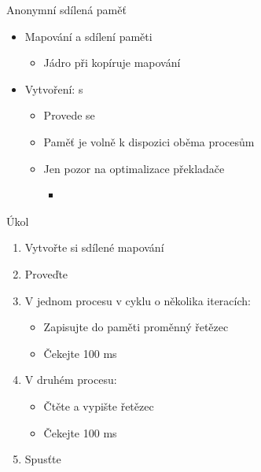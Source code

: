 
\begin{frame}{Anonymní sdílená paměť}

  \begin{itemize}
    \item Mapování a sdílení paměti
    \begin{itemize}
      \item Jádro při  kopíruje mapování
    \end{itemize}

    \pause

    \item Vytvoření:  s 
    \begin{itemize}
      \item Provede se 
      \item Paměť je volně k dispozici oběma procesům
      \item Jen pozor na optimalizace překladače
      \begin{itemize}
	\item {}
      \end{itemize}
    \end{itemize}
  \end{itemize}

\end{frame}

\begin{frame}{Úkol}

  \begin{enumerate}
    \item Vytvořte si sdílené mapování
    \item Proveďte 

    \item V jednom procesu v cyklu o několika iteracích:
    \begin{itemize}
      \item Zapisujte do paměti proměnný řetězec
      \item Čekejte 100 ms
    \end{itemize}

    \item V druhém procesu:
    \begin{itemize}
      \item Čtěte a vypište řetězec
      \item Čekejte 100 ms
    \end{itemize}

    \item Spusťte
  \end{enumerate}

\end{frame}

